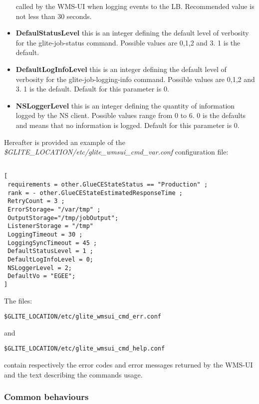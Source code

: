 \begin{itemize}
   called by the WMS-UI when logging events to the LB. Recommended value is not less than 30 seconds.   
 \item \textbf{DefaulStatusLevel} this is an integer defining the default level of verbosity for the glite-job-status 
   command. Possible values are 0,1,2 and 3. 1 is the default.
 \item \textbf{DefaultLogInfoLevel} this is an integer defining the default level of verbosity for the glite-job-logging-info
   command. Possible values are 0,1,2 and 3. 1 is the default. 
   Default for this parameter is 0.   
 \item \textbf{NSLoggerLevel} this is an integer defining the quantity of information logged by the NS client. Possible 
   values range from 0 to 6. 0 is the defaults and means that no information is logged. Default for this 
   parameter is 0. 

\end{itemize}
\smallskip


Hereafter is provided an example of the \textit{\$GLITE\_LOCATION/etc/glite\_wmsui\_cmd\_var.conf} configuration file: 


\smallskip
\begin{verbatim}

[ 
 requirements = other.GlueCEStateStatus == "Production" ; 
 rank = - other.GlueCEStateEstimatedResponseTime ; 
 RetryCount = 3 ; 
 ErrorStorage= "/var/tmp" ; 
 OutputStorage="/tmp/jobOutput"; 
 ListenerStorage = "/tmp" 
 LoggingTimeout = 30 ; 
 LoggingSyncTimeout = 45 ;  
 DefaultStatusLevel = 1 ; 
 DefaultLogInfoLevel = 0; 
 NSLoggerLevel = 2; 
 DefaultVo = "EGEE"; 
] 

\end{verbatim}
\smallskip

The files: 

\smallskip
\begin{verbatim}
$GLITE_LOCATION/etc/glite_wmsui_cmd_err.conf
\end{verbatim}
\smallskip

and 

\smallskip
\begin{verbatim}
$GLITE_LOCATION/etc/glite_wmsui_cmd_help.conf 
\end{verbatim}
\smallskip

contain respectively the error codes and error messages returned by the WMS-UI and the text describing the 
commands usage.

\newpage
\subsubsection{Common behaviours}
\label{commonbeh}

